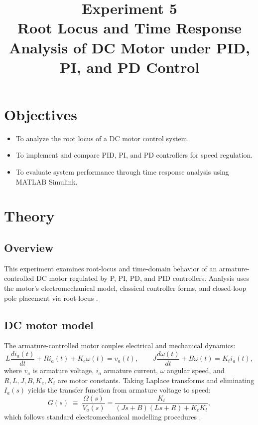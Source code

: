 \documentclass[12pt]{article}
\title{Experiment 5\\
\textbf{Root Locus and Time Response Analysis of DC Motor under PID, PI, and PD Control}}
\author{}
\date{}
\begin{document}


\pagebreak

\tableofcontents

\pagebreak
{}
\maketitle

\vspace{-5em}

\section*{Objectives}
\begin{itemize}
  \item To analyze the root locus of a DC motor control system.
  \item To implement and compare PID, PI, and PD controllers for speed regulation.
  \item To evaluate system performance through time response analysis using MATLAB Simulink.
\end{itemize}

\section*{Theory}

\subsection*{Overview}
This experiment examines root-locus and time-domain behavior of an armature-controlled DC motor regulated by P, PI, PD, and PID controllers. Analysis uses the motor's electromechanical model, classical controller forms, and closed-loop pole placement via root-locus \cite{Ogata,Franklin}.

\subsection*{DC motor model}
The armature-controlled motor couples electrical and mechanical dynamics:
\[
  L\frac{d i_a(t)}{dt} + R i_a(t) + K_e \omega(t) = v_a(t),
  \qquad
  J\frac{d\omega(t)}{dt} + B\omega(t) = K_t i_a(t),
\]
where $v_a$ is armature voltage, $i_a$ armature current, $\omega$ angular speed, and $R, L, J, B, K_e, K_t$ are motor constants. Taking Laplace transforms and eliminating $I_a(s)$ yields the transfer function from armature voltage to speed:
\[
  G(s)\;\equiv\;\frac{\Omega(s)}{V_a(s)}
  =\frac{K_t}{(J s + B)(L s + R) + K_e K_t},
\]
which follows standard electromechanical modelling procedures \cite{Nise,Ogata}.
\end{document}
